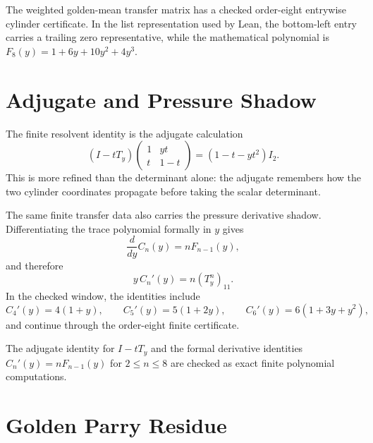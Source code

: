 \begin{theorem}
\label{thm:window6-parry-residue-cylinder-window}
The weighted golden-mean transfer matrix has a checked order-eight entrywise cylinder certificate. In the list representation used by Lean, the bottom-left entry carries a trailing zero representative, while the mathematical polynomial is $F_8(y)=1+6y+10y^2+4y^3$.
\end{theorem}

\section{Adjugate and Pressure Shadow}
\label{sec:window6-parry-residue-adjugate-pressure}

The finite resolvent identity is the adjugate calculation
$$
(I-tT_y)
\begin{pmatrix}
1&yt\\
t&1-t
\end{pmatrix}
=(1-t-yt^2)I_2.
$$
This is more refined than the determinant alone: the adjugate remembers how the two cylinder coordinates propagate before taking the scalar determinant.

The same finite transfer data also carries the pressure derivative shadow. Differentiating the trace polynomial formally in $y$ gives
$$
\frac{d}{dy}C_n(y)=nF_{n-1}(y),
$$
and therefore
$$
y\,C_n'(y)=n(T_y^n)_{11}.
$$
In the checked window, the identities include
$$
C_4'(y)=4(1+y),\qquad
C_5'(y)=5(1+2y),\qquad
C_6'(y)=6(1+3y+y^2),
$$
and continue through the order-eight finite certificate.

\begin{theorem}
\label{thm:window6-parry-residue-adjugate-pressure}
The adjugate identity for $I-tT_y$ and the formal derivative identities $C_n'(y)=nF_{n-1}(y)$ for $2\le n\le8$ are checked as exact finite polynomial computations.
\end{theorem}

\section{Golden Parry Residue}
\label{sec:window6-parry-residue-golden-projector}

